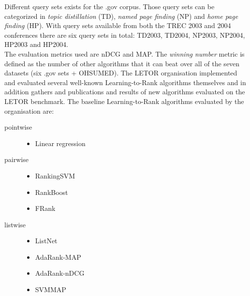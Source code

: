 Different query sets exists for the .gov corpus. Those query sets can be categorized in \emph{topic distillation} (TD), \emph{named page finding} (NP) and \emph{home page finding} (HP). With query sets available from both the TREC 2003 and 2004 conferences there are six query sets in total: TD2003, TD2004, NP2003, NP2004, HP2003 and HP2004.\\

The evaluation metrics used are \ac{nDCG} and \ac{MAP}. The \emph{winning number} metric is defined as the number of other algorithms that it can beat over all of the seven datasets (six .gov sets + OHSUMED). The LETOR organisation implemented and evaluated several well-known Learning-to-Rank algorithms themselves and in addition gathers and publications and results of new algorithms evaluated on the LETOR benchmark. The baseline Learning-to-Rank algorithms evaluated by the organisation are:
\begin{description}
\item[pointwise]{\leavevmode
	\begin{itemize}
	\item Linear regression
	\end{itemize}}
\item[pairwise]{\leavevmode
	\begin{itemize}
	\item RankingSVM\cite{Herbrich1999,Joachims2002}
	\item RankBoost\cite{Freund2003}
	\item FRank\cite{Tsai2007}
	\end{itemize}}
\item[listwise]{\leavevmode
	\begin{itemize}
	\item ListNet\cite{Cao2007}
	\item AdaRank-MAP\cite{Xu2007}
	\item AdaRank-nDCG\cite{Xu2007}
	\item SVMMAP\cite{Yue2007} 
	\end{itemize}}
\end{description} 
